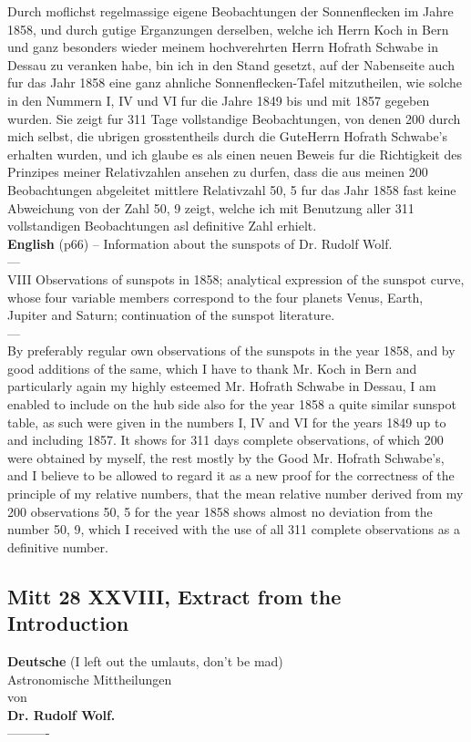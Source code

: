 \documentclass[12pt]{article}
\begin{document}
Durch moflichst regelmassige eigene Beobachtungen der Sonnenflecken im Jahre 1858, und durch gutige Erganzungen derselben, welche ich Herrn Koch in Bern und ganz besonders wieder meinem hochverehrten Herrn Hofrath Schwabe in Dessau zu veranken habe, bin ich in den Stand gesetzt, auf der Nabenseite auch fur das Jahr 1858 eine ganz ahnliche Sonnenflecken-Tafel mitzutheilen, wie solche in den Nummern I, IV und VI fur die Jahre 1849 bis und mit 1857 gegeben wurden. Sie zeigt fur 311 Tage vollstandige Beobachtungen, von denen 200 durch mich selbst, die ubrigen grosstentheils durch die GuteHerrn Hofrath Schwabe's erhalten wurden, und ich glaube es als einen neuen Beweis fur die Richtigkeit des Prinzipes meiner Relativzahlen ansehen zu durfen, dass die aus meinen 200 Beobachtungen abgeleitet mittlere Relativzahl 50, 5 fur das Jahr 1858 fast keine Abweichung von der Zahl 50, 9 zeigt, welche ich mit Benutzung aller 311 vollstandigen Beobachtungen asl definitive Zahl erhielt.\\

\textbf{English} (p66) -- 
Information about the sunspots of Dr. Rudolf Wolf.\\
---\\
VIII Observations of sunspots in 1858; analytical expression of the sunspot curve, whose four variable members correspond to the four planets Venus, Earth, Jupiter and Saturn; continuation of the sunspot literature.\\
---\\
By preferably regular own observations of the sunspots in the year 1858, and by good additions of the same, which I have to thank Mr. Koch in Bern and particularly again my highly esteemed Mr. Hofrath Schwabe in Dessau, I am enabled to include on the hub side also for the year 1858 a quite similar sunspot table, as such were given in the numbers I, IV and VI for the years 1849 up to and including 1857. It shows for 311 days complete observations, of which 200 were obtained by myself, the rest mostly by the Good Mr. Hofrath Schwabe's, and I believe to be allowed to regard it as a new proof for the correctness of the principle of my relative numbers, that the mean relative number derived from my 200 observations 50, 5 for the year 1858 shows almost no deviation from the number 50, 9, which I received with the use of all 311 complete observations as a definitive number.\\

\subsection{Mitt 28 XXVIII, Extract from the Introduction}\label{mitt:mitt 28 XXVIII intro}
{\centering
\textbf{Deutsche} (I left out the umlauts, don't be mad)\\
\huge{Astronomische Mittheilungen}\\
\footnotesize{von}\\
\textbf{Dr. Rudolf Wolf.}\\
----------\\
\par
}\\
\end{document}
